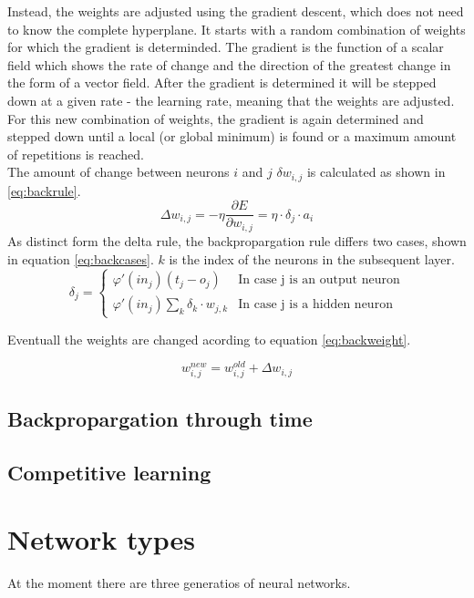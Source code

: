 \documentclass[10pt,a4paper,DIV=11]{scrreprt}
\begin{document}
Instead, the weights are adjusted using the gradient descent, which does not need to know the complete hyperplane. It starts with a random combination of weights for which the gradient is determinded. The gradient is the function of a scalar field which shows the rate of change and the direction of the greatest change in the form of a vector field. After the gradient is determined it will be stepped down at a given rate - the learning rate, meaning that the weights are adjusted. For this new combination of weights, the gradient is again determined and stepped down until a local (or global minimum) is found or a maximum amount of repetitions is reached.\\

The amount of change between neurons $i$ and $j$ $\delta w_{i,j}$ is calculated as shown in \eqref{eq:backrule}.
\begin{equation}
\Delta w_{i,j} = -\eta \frac{\partial E}{\partial w_{i,j}} = \eta \cdot \delta_j \cdot a_i
\label{eq:backrule}
\end{equation}
As distinct form the delta rule, the backpropargation rule differs two cases, shown in equation \eqref{eq:backcases}. $k$ is the index of the neurons in the subsequent layer.
\begin{equation}
   \delta_j =
   \begin{cases}
     \varphi'(in_j)(t_j-o_j) & \text{In case j is an output neuron} \\
     \varphi'(in_j)\sum_{k} \delta_k \cdot w_{j,k} & \text{In case j is a hidden neuron}
   \end{cases}
\label{eq:backcases}
\end{equation}

Eventuall the weights are changed acording to equation \eqref{eq:backweight}.

\begin{equation}
   w_{i,j}^{new} = w_{i,j}^{old} + \Delta w_{i,j}
\label{eq:backweight}
\end{equation}

\subsection{Backpropargation through time}
\subsection{Competitive learning}
\section{Network types}
At the moment there are three generatios of neural networks. 
\end{document}
